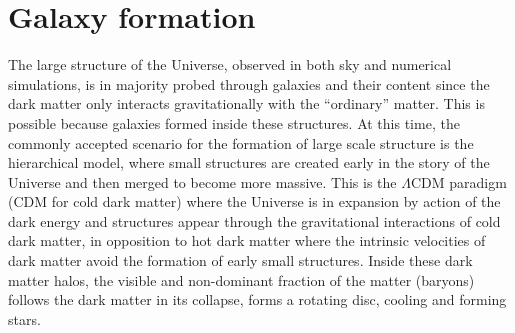 \section{Galaxy formation}
\label{sec:galaxy_formation}

The large structure of the Universe, observed in both sky and numerical
simulations, is in majority probed through galaxies and their content since the
dark matter only interacts gravitationally with the ``ordinary'' matter. This
is possible because galaxies formed inside these structures. At this time, the
commonly accepted scenario for the formation of large scale structure is the
hierarchical model, where small structures are created early in the story of
the Universe and then merged to become more massive. This is the $\Lambda$CDM
paradigm (CDM for cold dark matter) where the Universe is in expansion by
action of the dark energy and structures appear through the gravitational
interactions of cold dark matter, in opposition to hot dark matter where the
intrinsic velocities of dark matter avoid the formation of early small
structures. Inside these dark matter halos, the visible and non-dominant
fraction of the matter (baryons) follows the dark matter in its collapse, forms
a rotating disc, cooling and forming stars.

